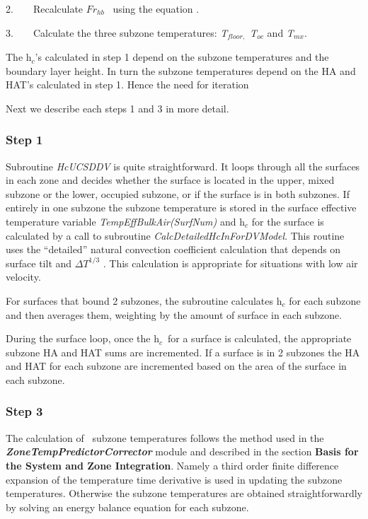 2.~~~~Recalculate \(F{r_{hb}}\) ~using the equation .

3.~~~~Calculate the three subzone temperatures: \emph{T\(_{floor,}\) T\(_{oc}\)} and \emph{T\(_{mx}\)}.

The h\(_{c}\)'s calculated in step 1 depend on the subzone temperatures and the boundary layer height. In turn the subzone temperatures depend on the HA and HAT's calculated in step 1. Hence the need for iteration

Next we describe each steps 1 and 3 in more detail.

\subsubsection{Step 1}\label{step-1}

Subroutine \emph{HcUCSDDV} is quite straightforward. It loops through all the surfaces in each zone and decides whether the surface is located in the upper, mixed subzone or the lower, occupied subzone, or if the surface is in both subzones. If entirely in one subzone the subzone temperature is stored in the surface effective temperature variable \emph{TempEffBulkAir(SurfNum)} and h\(_{c}\) for the surface is calculated by a call to subroutine \emph{CalcDetailedHcInForDVModel}. This routine uses the ``detailed'' natural convection coefficient calculation that depends on surface tilt and \(\Delta {T^{1/3}}\) . This calculation is appropriate for situations with low air velocity.

For surfaces that bound 2 subzones, the subroutine calculates h\(_{c}\) for each subzone and then averages them, weighting by the amount of surface in each subzone.

During the surface loop, once the h\(_{c}\)~for a surface is calculated, the appropriate subzone HA and HAT sums are incremented. If a surface is in 2 subzones the HA and HAT for each subzone are incremented based on the area of the surface in each subzone.

\subsubsection{Step 3}\label{step-3}

The calculation of~ subzone temperatures follows the method used in the \textbf{\emph{ZoneTempPredictorCorrector}} module and described in the section \textbf{Basis for the System and Zone Integration}. Namely a third order finite difference expansion of the temperature time derivative is used in updating the subzone temperatures. Otherwise the subzone temperatures are obtained straightforwardly by solving an energy balance equation for each subzone.

